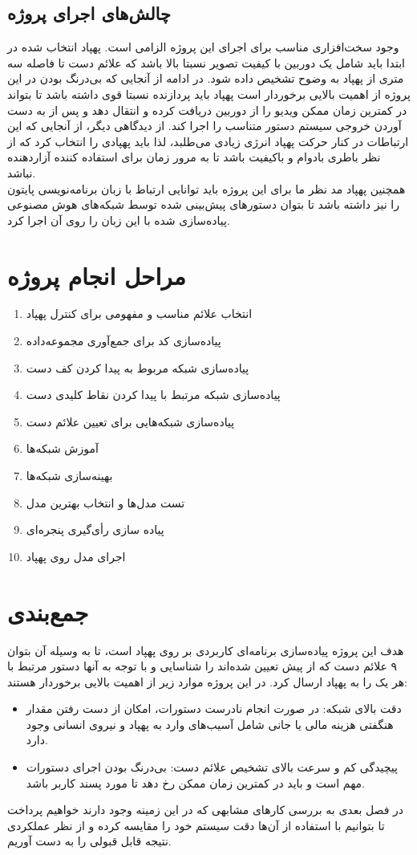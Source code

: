 \subsection{چالش‌های اجرای پروژه}
وجود سخت‌افزاری مناسب برای اجرای این پروژه الزامی است. پهپاد انتخاب شده در ابتدا باید شامل یک دوربین با کیفیت تصویر
نسبتا بالا باشد که علائم دست تا فاصله سه متری از پهپاد به وضوح تشخيص داده شود.
در ادامه از آنجایی که بی‌درنگ بودن در این پروژه از اهمیت بالایی برخوردار است پهپاد باید پردازنده نسبتا قوی داشته باشد تا بتواند در کمترین زمان ممکن ویدیو را از دوربین دریافت کرده و انتقال دهد و پس از به دست آوردن خروجی سیستم دستور متناسب را اجرا کند. از دیدگاهی دیگر، از آنجایی که این ارتباطات در کنار حرکت پهپاد انرژی زیادی می‌طلبد، لذا باید پهپادی را انتخاب کرد
که از نظر باطری بادوام و باکیفیت باشد تا به مرور زمان برای استفاده کننده آزاردهنده نباشد.
\\
همچنین پهپاد مد نظر ما برای این پروژه باید توانایی ارتباط با  زبان برنامه‌نویسی پایتون را نیز داشته باشد تا بتوان دستورهای پیش‌بینی شده توسط شبکه‌های هوش مصنوعی پیاده‌سازی شده با این زبان را روی آن اجرا کرد.


\section{مراحل انجام پروژه}
\begin{enumerate}
    \item  انتخاب علائم‌ مناسب و مفهومی برای کنترل پهپاد
    \item  پیاده‌سازی کد برای جمع‌آوری مجموعه‌داده
    \item  پیاده‌سازی شبکه مربوط به پیدا کردن کف دست 
    \item  پیاده‌سازی شبکه مرتبط با پیدا کردن نقاط کلیدی دست 
    \item  پیاده‌سازی شبکه‌هایی برای تعیین علائم دست
    \item  آموزش شبکه‌ها
    \item  بهینه‌سازی شبکه‌ها
    \item  تست مدل‌ها و انتخاب بهترین مدل
    \item  پیاده سازی رأی‌گیری پنجره‌ای
    \item  اجرای مدل روی پهپاد
\end{enumerate}
 

\section{جمع‌بندی}
 هدف این پروژه پیاده‌سازی برنامه‌ای کاربردی بر روی پهپاد است، تا به وسیله آن بتوان ۹ علائم دست که از پیش تعیین شده‌اند را شناسایی و با توجه به آنها دستور مرتبط با هر یک را به پهپاد ارسال کرد.
 در این پروژه موارد زیر از اهمیت بالایی برخوردار هستند:
 \begin{itemize}
    \item دقت بالای شبکه: در صورت انجام نادرست دستورات، امکان از دست رفتن مقدار هنگفتی هزینه مالی یا جانی شامل آسیب‌های وارد به پهپاد و نیروی انسانی وجود دارد.
    \item پیچیدگی کم و سرعت بالای تشخیص علائم دست: بی‌درنگ بودن اجرای دستورات مهم است و باید در کمترین زمان ممکن رخ دهد تا مورد پسند کاربر باشد.
\end{itemize}

در فصل بعدی به بررسی کار‌های مشابهی که در این زمینه وجود دارند خواهیم پرداخت تا بتوانیم با استفاده از آن‌ها دقت سیستم خود را مقایسه کرده و از نظر 
عملکردی نتیجه قابل قبولی را به دست آوریم.


